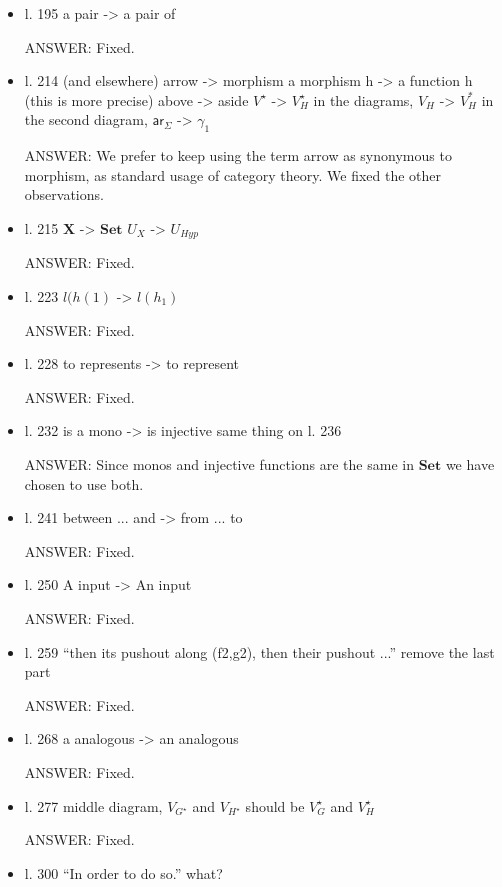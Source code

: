 \documentclass[english,11pt,a4paper]{article}
\begin{document}
\begin{itemize}
\item l. 195 a pair -> a pair of

ANSWER: Fixed.

\item l. 214 (and elsewhere) arrow -> morphism
a morphism h -> a function h (this is more precise)
above -> aside
$V^\star$ -> $V^\star_H$
in the diagrams, $V_H$ -> $V^*_H$
in the second diagram, $\mathsf{ar}_\Sigma$ -> $\gamma_1$

ANSWER: We prefer to keep using the term arrow as synonymous to morphism, as standard usage of category theory. We fixed the other observations.

\item  l. 215 $\mathbf{X}$ -> $\mathbf{Set}$
$U_X$ -> $U_{Hyp}$

ANSWER: Fixed.

\item l. 223 $l(h(1)$ -> $l(h_1)$

ANSWER: Fixed.

\item l. 228 to represents -> to represent

ANSWER: Fixed.

\item l. 232 is a mono -> is injective
same thing on l. 236

ANSWER: Since monos and injective functions are the same in $\mathbf{Set}$ we have chosen to use both.

\item l. 241 between ... and -> from ... to

ANSWER: Fixed.

\item l. 250 A input -> An input

ANSWER: Fixed.

\item l. 259 ``then its pushout along (f2,g2), then their pushout ...'' remove the last part

ANSWER: Fixed.

\item l. 268 a analogous -> an analogous

ANSWER: Fixed.

\item 
l. 277 middle diagram, $V_{G^\star}$ and $V_{H^\star}$ should be $V^\star_G$ and $V^\star_H$

ANSWER: Fixed.

\item l. 300 ``In order to do so.'' what?


\end{itemize}
\end{document}
